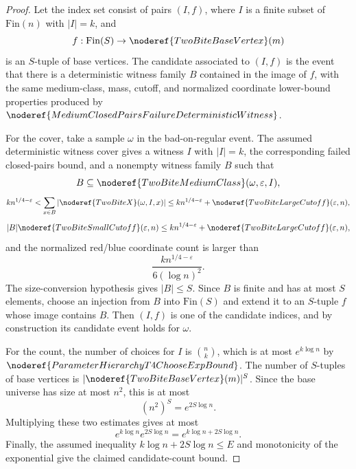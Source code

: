 \begin{proof}
Let the index set consist of pairs \((I,f)\), where \(I\) is a finite subset
of \(\mathrm{Fin}(n)\) with \(|I|=k\), and
\[
f:\mathrm{Fin}(S)\to \noderef{TwoBiteBaseVertex}(m)
\]
is an \(S\)-tuple of base vertices.  The candidate associated to \((I,f)\)
is the event that there is a deterministic witness family \(B\) contained in
the image of \(f\), with the same medium-class, mass, cutoff, and normalized
coordinate lower-bound properties produced by
\(\noderef{MediumClosedPairsFailureDeterministicWitness}\).

For the cover, take a sample \(\omega\) in the bad-on-regular event.  The
assumed deterministic witness cover gives a witness \(I\) with \(|I|=k\), the
corresponding failed closed-pairs bound, and a nonempty witness family \(B\)
such that
\[
B\subseteq \noderef{TwoBiteMediumClass}(\omega,\varepsilon,I),
\]
\[
k n^{1/4-\varepsilon}
<
\sum_{x\in B}|\noderef{TwoBiteX}(\omega,I,x)|
\le
k n^{1/4-\varepsilon}+\noderef{TwoBiteLargeCutoff}(\varepsilon,n),
\]
\[
|B|\noderef{TwoBiteSmallCutoff}(\varepsilon,n)
\le
k n^{1/4-\varepsilon}+\noderef{TwoBiteLargeCutoff}(\varepsilon,n),
\]
and the normalized red/blue coordinate count is larger than
\[
\frac{k n^{1/4-\varepsilon}}{6(\log n)^2}.
\]
The size-conversion hypothesis gives \(|B|\le S\).  Since \(B\) is finite and
has at most \(S\) elements, choose an injection from \(B\) into
\(\mathrm{Fin}(S)\) and extend it to an \(S\)-tuple \(f\) whose image contains
\(B\).  Then \((I,f)\) is one of the candidate indices, and by construction
its candidate event holds for \(\omega\).

For the count, the number of choices for \(I\) is \(\binom nk\), which is at
most \(e^{k\log n}\) by \(\noderef{ParameterHierarchyT4ChooseExpBound}\).
The number of \(S\)-tuples of base vertices is
\(|\noderef{TwoBiteBaseVertex}(m)|^S\).  Since the base universe has size at
most \(n^2\), this is at most
\[
(n^2)^S=e^{2S\log n}.
\]
Multiplying these two estimates gives at most
\[
e^{k\log n}e^{2S\log n}=e^{k\log n+2S\log n}.
\]
Finally, the assumed inequality \(k\log n+2S\log n\le E\) and monotonicity of
the exponential give the claimed candidate-count bound.
\end{proof}
